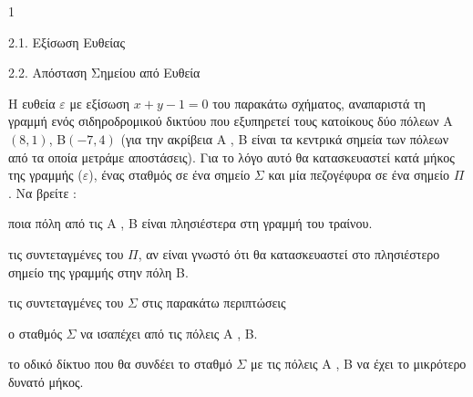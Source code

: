 \begin{ylh}{1}
    \item 2.1. Εξίσωση Ευθείας
    \item 2.2. Απόσταση Σημείου από Ευθεία
\end{ylh}
\begin{figure}
\end{figure}
Η ευθεία $\varepsilon$ με εξίσωση $x+y-1=0$ του παρακάτω σχήματος, αναπαριστά τη γραμμή ενός σιδηροδρομικού δικτύου που εξυπηρετεί τους κατοίκους δύο πόλεων Α$(8,1)$, Β$(-7,4)$ (για την ακρίβεια Α , Β είναι τα κεντρικά σημεία των πόλεων από τα οποία μετράμε αποστάσεις). Για το λόγο αυτό θα κατασκευαστεί κατά μήκος της γραμμής ($\varepsilon$), ένας σταθμός σε ένα σημείο $\Sigma$ και μία πεζογέφυρα σε ένα σημείο $\Pi$. Να βρείτε :
\begin{alist}
    \item ποια πόλη από τις Α , Β είναι πλησιέστερα στη γραμμή του τραίνου. 
    \item τις συντεταγμένες του $\Pi$, αν είναι γνωστό ότι θα κατασκευαστεί στο πλησιέστερο σημείο της γραμμής στην πόλη Β. 
    \item τις συντεταγμένες του $\Sigma$ στις παρακάτω περιπτώσεις 
    \begin{rlist}
        \item ο σταθμός $\Sigma$ να ισαπέχει από τις πόλεις Α , Β.
        \item το οδικό δίκτυο που θα συνδέει το σταθμό $\Sigma$ με τις πόλεις Α , Β να έχει το μικρότερο δυνατό μήκος.
    \end{rlist}
\end{alist}